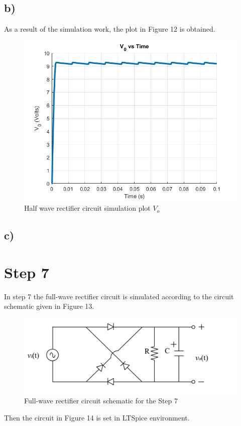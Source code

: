 \documentclass[letterpaper,12pt]{article}
\begin{document}
\subsection{b)}
As a result of the simulation work, the plot in Figure 12 is obtained.
\begin{figure}[H]
    \centering
   \includegraphics[width=1\textwidth]{6.png}
   \caption{Half wave rectifier circuit simulation plot \(V_o\) }
\end{figure} 



\subsection{c)}
\section{Step 7}
In step 7 the full-wave rectifier circuit is simulated according to the circuit schematic given in Figure 13.

\begin{figure}[H]
    \centering
   \includegraphics[width=1\textwidth]{7_1.png}
   \caption{Full-wave rectifier circuit schematic for the Step 7}
\end{figure} 
Then  the circuit in Figure 14 is set in  LTSpice environment.
\end{document}
